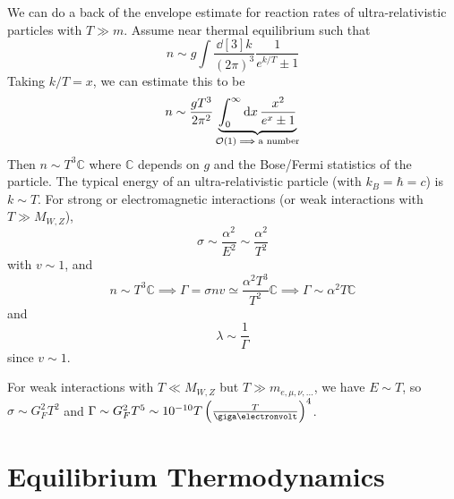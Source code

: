 \documentclass[a4paper,twoside,master.tex]{subfiles}
\begin{document}
We can do a back of the envelope estimate for reaction rates of ultra-relativistic particles with $ T \gg m $. Assume near thermal equilibrium such that
\begin{equation}
    n \sim g \int \frac{\dd[3]{k}}{(2 \pi)^3} \frac{1}{e^{k/T} \pm 1}
\end{equation}
Taking $ k/T = x $, we can estimate this to be
\begin{equation}
    n \sim \frac{g T^3}{2 \pi^2} \underbrace{\int_0^{\infty} \dd{x} \frac{x^2}{e^{x}\pm 1}}_{\order{1} \implies \text{a number}}
\end{equation}
Then $ n \sim T^3 \mathbb{C} $ where $ \mathbb{C} $ depends on $ g $ and the Bose/Fermi statistics of the particle. The typical energy of an ultra-relativistic particle (with $ k_B = \hbar = c $) is $ k \sim T $. For strong or electromagnetic interactions (or weak interactions with $ T\gg M_{W,Z} $),
\begin{equation}
    \sigma \sim \frac{\alpha^2}{E^2} \sim \frac{\alpha^2}{T^2}
\end{equation}
with $ v \sim 1 $, and
\begin{equation}
    n \sim T^3 \mathbb{C} \implies \Gamma = \sigma n v \simeq \frac{\alpha^2 T^3}{T^2} \mathbb{C} \implies \Gamma \sim \alpha^2 T \mathbb{C}
\end{equation}
and
\begin{equation}
    \lambda \sim \frac{1}{\Gamma}
\end{equation}
since $ v \sim 1 $.

For weak interactions with $ T\ll M_{W,Z} $ but $ T \gg m_{e, \mu, \nu, \ldots} $, we have $ E \sim T $, so $ \sigma \sim G_F^2 T^2 $ and $ \Gamma \sim G_F^2 T^5 \sim 10^{-10} T \left( \frac{T}{\giga\electronvolt} \right)^4 $.

\section{Equilibrium Thermodynamics}\label{sec:equilibrium_thermodynamics}
\end{document}
